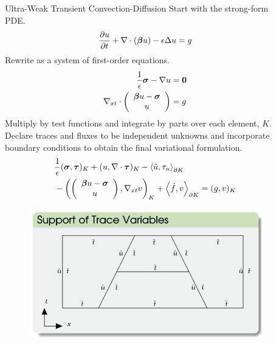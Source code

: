 \documentclass[final]{beamer}
\newlength{\sepwid}
\newlength{\onecolwid}
\begin{document}
\begin{frame}[t]
\begin{columns}[t]
\begin{column}{\onecolwid}
\begin{block}{Ultra-Weak Transient Convection-Diffusion}
Start with the strong-form PDE.
\[
\frac{\partial u}{\partial t}+\nabla\cdot(\boldsymbol\beta u)-\epsilon\Delta u = g
\]
Rewrite as a system of first-order equations.
\begin{align*}
\frac{1}{\epsilon}\boldsymbol\sigma-\nabla u&=\boldsymbol0\\
\nabla_{xt}\cdot\left( \begin{array}{c} \boldsymbol\beta u-\boldsymbol\sigma\\ u\\ \end{array} \right)&=g
\end{align*}
Multiply by test functions and integrate by parts over each element, $K$.
Declare traces and fluxes to be independent unknowns and incorporate boundary
conditions to obtain the final variational formulation.
\begin{align*}
&\frac{1}{\epsilon}(\boldsymbol\sigma,\boldsymbol\tau)_K
+(u,\nabla\cdot\boldsymbol\tau)_K
-\left\langle \hat u,\tau_n \right\rangle_{\partial K}\\
&-\left( \left( \begin{array}{c} \boldsymbol\beta u-\boldsymbol\sigma\\ u\\ \end{array} \right),\nabla_{xt} v \right)_K+\left\langle \hat f,v \right\rangle_{\partial K}
=(g,v)_K
\end{align*}
\begin{figure}
\includegraphics[width=0.7\linewidth]{figs/TraceSupport.png}
\end{figure}
\end{block}


\end{column} %

\begin{column}{\sepwid}\end{column} %

\begin{column}{\onecolwid} %



\end{column}
\end{columns}
\end{frame}
\end{document}
